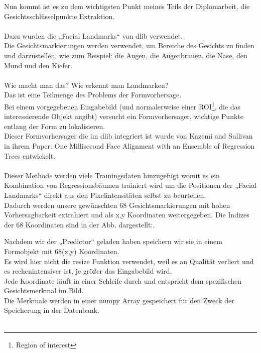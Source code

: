 Nun kommt ist es zu dem wichtigsten Punkt meines Teils der Diplomarbeit, die Gesichtsschlüsselpunkte Extraktion. \\\\
Dazu wurden die „Facial Landmarks“ von dlib verwendet. \\
Die Gesichtsmarkierungen werden verwendet, um Bereiche des Gesichts zu finden und darzustellen, wie zum Beispiel: die Augen, die Augenbrauen, die Nase, den Mund und den Kiefer. \\\\
Wie macht man das? Wie erkennt man Landmarken? \\Das ist eine Teilmenge des Problems der Formvorhersage.\\ Bei einem vorgegebenen Eingabebild (und normalerweise einer ROI\footnote{Region of interest}, die das interessierende Objekt angibt) versucht ein Formvorhersager, wichtige Punkte entlang der Form zu lokalisieren. \\
Dieser Formvorhersager die im dlib integriert ist wurde von Kazemi and Sullivan in ihrem Paper: One Millisecond Face Alignment with an Ensemble of Regression Trees entwickelt.\cite{Kazemi2014OneMF} \\\\
Dieser Methode werden viele Trainingsdaten hinzugefügt womit es ein Kombination von Regressionsbäumen trainiert wird um die Positionen der „Facial Landmarks“ direkt aus den Pixelintensitäten selbst zu beurteilen.\cite{Kazemi2014OneMF} \\

Dadurch werden unsere gewünschten 68 Gesichtsmarkierungen mit hohen Vorhersagbarkeit extrahiert und als x,y Koordinaten weitergegeben. 
Die Indizes der 68 Koordinaten sind in der Abb. dargestellt:.%



Nachdem wir der „Predictor“ geladen haben speichern wir sie in einem Formobjekt mit 68(x,y) Koordinaten. \\
Es wird hier nicht die resize Funktion verwendet, weil es an Qualität verliert und es rechenintensiver ist, je größer das Eingabebild wird. \\
Jede Koordinate läuft in einer Schleife durch und entspricht dem spezifischen Gesichtsmerkmal im Bild.  \\
Die Merkmale werden in einer numpy Array gespeichert für den Zweck der Speicherung in der Datenbank. \\\\




